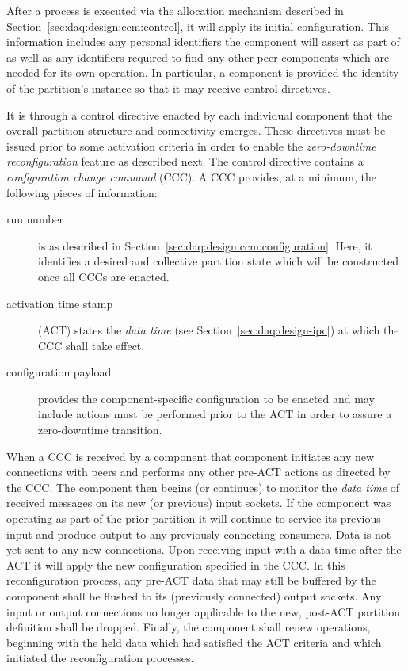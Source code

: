 After a process is executed via the allocation mechanism described in Section~\ref{sec:daq:design:ccm:control}, it will apply its initial configuration. 
This information includes any personal identifiers the component will assert as part of  as well as any identifiers required to find any other peer components which are needed for its own operation. 
In particular, a component is provided the identity of the partition's  instance so that it may receive control directives.

It is through a control directive enacted by each individual component that the overall partition structure and connectivity emerges.  
These directives must be issued prior to some activation criteria in order to enable the \textit{zero-downtime reconfiguration} feature as described next.
The control directive contains a \textit{configuration change command} (CCC).
A CCC provides, at a minimum, the following pieces of information:

\begin{description}
\item[run number] is as described in Section~\ref{sec:daq:design:ccm:configuration}. 
  Here, it identifies a desired and collective partition state which will be constructed once all CCCs are enacted.
\item[activation time stamp] (ACT) states the \textit{data time} (see Section~\ref{sec:daq:design-ipc}) at which the CCC shall take effect. 
\item[configuration payload] provides the component-specific configuration to be enacted and may include   actions must be performed prior to the ACT in order to assure a zero-downtime transition.
\end{description}

When a CCC is received by a component that component initiates any new connections with peers and performs any other pre-ACT actions as directed by the CCC. 
The component then begins (or continues) to monitor the \textit{data time} of received messages on its new (or previous) input sockets. 
If the component was operating as part of the prior partition it will continue to service its previous input and produce output to any previously connecting consumers.
Data is not yet sent to any new connections.
Upon receiving input with a data time after the ACT it will apply the new configuration specified in the CCC. 
In this reconfiguration process, any pre-ACT data that may still be buffered by the component shall be flushed to its (previously connected) output sockets. 
Any input or output connections no longer applicable to the new, post-ACT partition definition shall be dropped. 
Finally, the component shall renew operations, beginning with the held data which had satisfied the ACT criteria and which initiated the reconfiguration processes.

